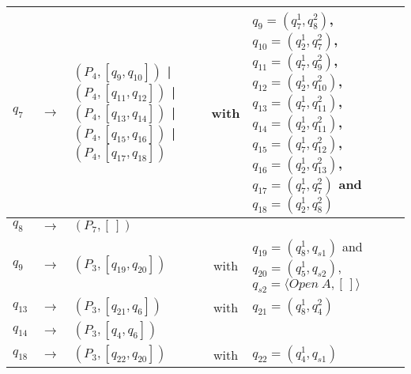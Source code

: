 \begin{table}[ht]
\begin{tabular}[t]{|lcp{5.7cm}|lcp{5cm}|}
	\hline
	
	$q_{7}$ & $\longrightarrow$ & $(P_{4}, [q_{9}, q_{10}])$ | $(P_{4}, [q_{11}, q_{12}])$ | $(P_{4}, [q_{13}, q_{14}])$ | $(P_{4}, [q_{15}, q_{16}])$ | $(P_{4}, [q_{17}, q_{18}])$ & & with & $q_{9}=(q_{7}^{1}, q_{8}^{2})$, $q_{10}=(q_{2}^{1}, q_{7}^{2})$, $q_{11}=(q_{7}^{1}, q_{9}^{2})$, $q_{12}=(q_{2}^{1}, q_{10}^{2})$, $q_{13}=(q_{7}^{1}, q_{11}^{2})$, $q_{14}=(q_{2}^{1}, q_{11}^{2})$, $q_{15}=(q_{7}^{1}, q_{12}^{2})$, $q_{16}=(q_{2}^{1}, q_{13}^{2})$, $q_{17}=(q_{7}^{1}, q_{7}^{2})$ and $q_{18}=(q_{2}^{1}, q_{8}^{2})$\\
	\hline
	
	$q_{8}$ & $\longrightarrow$ & $(P_{7}, [\,])$ & & &\\
	
	\hline
	
	$q_{9}$ & $\longrightarrow$ & $(P_{3}, [q_{19}, q_{20}])$ & & with & $q_{19}=(q_{8}^{1}, q_{s1})$ and $q_{20}=(q_{5}^{1}, q_{s2})$, $q_{s2}=\langle Open~A,[\,] \rangle $\\
	
	\hline
	
	$q_{13}$ & $\longrightarrow$ & $(P_{3}, [q_{21}, q_{6}])$ & & with & $q_{21}=(q_{8}^{1}, q_{4}^{2})$\\
	
	\hline
	
	$q_{14}$ & $\longrightarrow$ & $(P_{3}, [q_{4}, q_{6}])$ & & &\\
	
	\hline
	
	$q_{18}$ & $\longrightarrow$ & $(P_{3}, [q_{22}, q_{20}])$ & & with & $q_{22}=(q_{4}^{1}, q_{s1})$\\
	

\end{tabular}
\end{table}
